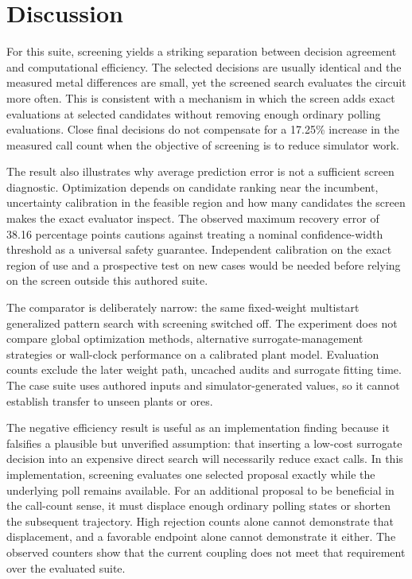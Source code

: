 \documentclass[10pt]{article}
\begin{document}
\section{Discussion}
For this suite, screening yields a striking separation between decision agreement and computational efficiency. The selected decisions are usually identical and the measured metal differences are small, yet the screened search evaluates the circuit more often. This is consistent with a mechanism in which the screen adds exact evaluations at selected candidates without removing enough ordinary polling evaluations. Close final decisions do not compensate for a 17.25\% increase in the measured call count when the objective of screening is to reduce simulator work.

The result also illustrates why average prediction error is not a sufficient screen diagnostic. Optimization depends on candidate ranking near the incumbent, uncertainty calibration in the feasible region and how many candidates the screen makes the exact evaluator inspect. The observed maximum recovery error of 38.16 percentage points cautions against treating a nominal confidence-width threshold as a universal safety guarantee. Independent calibration on the exact region of use and a prospective test on new cases would be needed before relying on the screen outside this authored suite.

The comparator is deliberately narrow: the same fixed-weight multistart generalized pattern search with screening switched off. The experiment does not compare global optimization methods, alternative surrogate-management strategies or wall-clock performance on a calibrated plant model. Evaluation counts exclude the later weight path, uncached audits and surrogate fitting time. The case suite uses authored inputs and simulator-generated values, so it cannot establish transfer to unseen plants or ores.

The negative efficiency result is useful as an implementation finding because it falsifies a plausible but unverified assumption: that inserting a low-cost surrogate decision into an expensive direct search will necessarily reduce exact calls. In this implementation, screening evaluates one selected proposal exactly while the underlying poll remains available. For an additional proposal to be beneficial in the call-count sense, it must displace enough ordinary polling states or shorten the subsequent trajectory. High rejection counts alone cannot demonstrate that displacement, and a favorable endpoint alone cannot demonstrate it either. The observed counters show that the current coupling does not meet that requirement over the evaluated suite.
\end{document}
